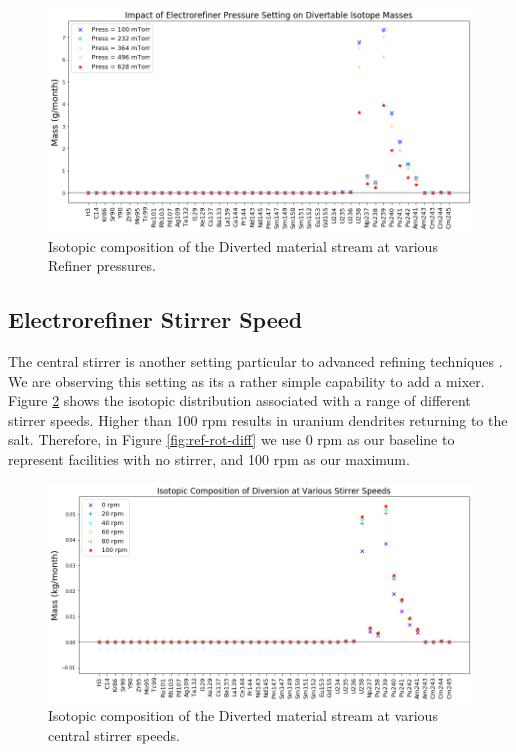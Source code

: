 \begin{figure}
	\includegraphics[width=\linewidth]{images/pressure-sa-diff}
	\caption{Isotopic composition of the Diverted material stream at various Refiner pressures.}
	\label{fig:ref-press-diff}
\end{figure}

\subsection{Electrorefiner Stirrer Speed}

The central stirrer is another setting particular to advanced refining techniques \cite{lee_advanced_2008}. We are observing this setting as its a rather simple capability to
add a mixer. Figure \ref{fig:ref-rot-sa} shows the isotopic distribution associated with a
range of different stirrer speeds. Higher than 100 rpm results in uranium dendrites returning
to the salt. Therefore, in Figure \ref{fig:ref-rot-diff} we use 0 rpm as our baseline to represent facilities with no stirrer, and 100 rpm as our maximum. 

\begin{figure}
	\includegraphics[width=\linewidth]{images/rotation-sa-comp}
	\caption{Isotopic composition of the Diverted material stream at various central stirrer speeds.}
	\label{fig:ref-rot-sa}
\end{figure}

